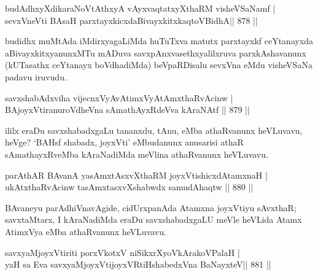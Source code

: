
\begin{shl}
budAdhxyXdikaraNoVtAthxyA vAyxvaqtatxyXthaRM visheVSaNamf | \\
sevxVneVti BAsaH parxtayxkicxdaBivayxkitxkaqtoV\s BidhA\hfill ||  878 ||  
\end{shl}

\begin{artha}
budidhx muMtAda iMdirxyagaLiMda huTuTxva matutx parxtayxkf ceYtanayxda aBivayxkitxyanunxMTu mADuva savxpAnxvasethxyalilxruva parxkAshavanunx (kUTasathx ceYtanayx boVdhadiMda) beVpaRDisalu sevxVna eMdu visheVSaNa padavu iruvudu.
\end{artha}

\begin{shl}
savxshabAdxviha vijecnxVyAvAtimxVyAtAmxthaRvAcinw | \\
BAjoyxVtiranuroVdheVna sAmathAyxRdeVva kAraNAtf \hfill||  879 ||  
\end{shl}

\begin{artha}
ililx eraDu savxshabadxgaLu tananxdu, tAnu, eMba athaRvanunx heVLuvavu, heVge? `BAHsf shabadx, joyxVti' eMbudanunx anusarisi athaR sAmathayxRveMba kAraNadiMda meVlina athaRvanunx heVLuvavu.
\end{artha}

\begin{shl}
parAthAR BAvanA yasAmxtAsxvXthaRM joyxVtishicxdAtamxnaH | \\
ukAtxthaRvAcinw tasAmxtasxvXshabwdx samudAhaqtw \hfill||  880 ||  
\end{shl}

\begin{artha}
BAvaneyu parAdhiVnavAgide, cidUrxpanAda Atamxna joyxVtiyu sAvxthaR; savxtaMtarx, I kAraNadiMda eraDu savxshabadxgaLU meVle heVLida Atamx AtimxVya eMba athaRvanunx heVLuvavu.
\end{artha}


\begin{shl}
savxyaMjoyxVtiriti porxVkotxV niSikxrXyoV\s kArakoV\s PalaH | \\
yaH sa Eva savxyaMjoyxVtijoyxVRtiHshabedxVna BaNayxteV\hfill ||  881 ||  
\end{shl}

